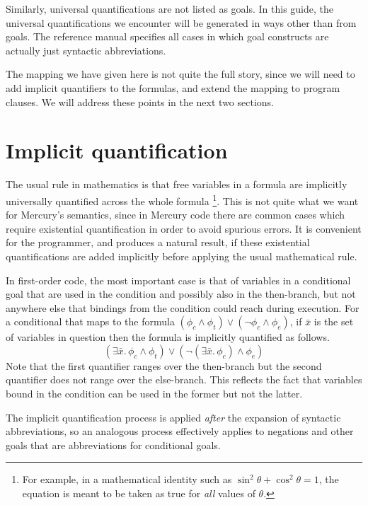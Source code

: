 Similarly,
universal quantifications are not listed as goals.
In this guide,
the universal quantifications we encounter will be
generated in ways other than from goals.
The reference manual specifies all cases
in which goal constructs are actually just syntactic abbreviations.

The mapping we have given here is not quite the full story,
since we will need to add implicit quantifiers to the formulas,
and extend the mapping to program clauses.
We will address these points in the next two sections.

\section{Implicit quantification}
\label{sec:implicit-quantification}

The usual rule in mathematics
is that free variables in a formula
are implicitly universally quantified across the whole formula%
\footnote{
For example,
in a mathematical identity such as
$\sin^2\theta + \cos^2\theta = 1$,
the equation is meant to be taken as true
for \emph{all} values of $\theta$.
}.
This is not quite what we want for Mercury's semantics,
since in Mercury code there are common cases
which require existential quantification
in order to avoid spurious errors.
It is convenient for the programmer,
and produces a natural result,
if these existential quantifications are added implicitly
before applying the usual mathematical rule.

In first-order code,
the most important case is that of variables in a conditional goal
that are used in the condition and possibly also in the then-branch,
but not anywhere else that bindings from the condition
could reach during execution.
For a conditional that maps to the formula
$(\phi_c \land \phi_t) \lor (\lnot \phi_c \land \phi_e)$,
if $\bar{x}$ is the set of variables in question
then the formula is implicitly quantified as follows.
\[
    (\exists \bar{x}.\, \phi_c \land \phi_t) \lor
    (\lnot (\exists \bar{x}.\, \phi_c) \land \phi_e)
\]
Note that the first quantifier ranges over the then-branch
but the second quantifier does not range over the else-branch.
This reflects the fact that variables bound in the condition
can be used in the former but not the latter.

The implicit quantification process is applied
\emph{after} the expansion of syntactic abbreviations,
so an analogous process effectively applies to negations
and other goals that are abbreviations for conditional goals.


